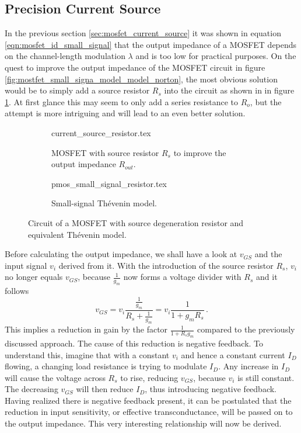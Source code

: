 \subsection{Precision Current Source}%
\label{sec:precision_current_source}
In the previous section \ref{sec:mosfet_current_source} it was shown in equation \ref{eqn:mosfet_id_small_signal} that the output impedance of a MOSFET depends on the channel-length modulation $\lambda$ and is too low for practical purposes. On the quest to improve the output impedance of the MOSFET circuit in figure \ref{fig:mostfet_small_signa_model_model_norton}, the most obvious solution would be to simply add a source resistor $R_s$ into the circuit as shown in in figure \ref{fig:pmos_current_source_resistor}. At first glance this may seem to only add a series resistance to $R_o$, but the attempt is more intriguing and will lead to an even better solution.
\begin{figure}[ht]
    \centering
    \begin{subfigure}[t]{0.45\linewidth}
        \centering
        {current_source_resistor.tex}
        \caption{MOSFET with source resistor $R_s$ to improve the output impedance $R_{out}$.}
        \label{fig:pmos_current_source_resistor}
    \end{subfigure}%
    \begin{subfigure}[t]{0.45\linewidth}
         \centering
         {pmos_small_signal_resistor.tex}
         \caption{Small-signal Thévenin model.}
         \label{fig:pmos_current_source_resistor_small_signal}
     \end{subfigure}%
     \caption{Circuit of a MOSFET with source degeneration resistor and equivalent Thévenin model.}
\end{figure}

Before calculating the output impedance, we shall have a look at $v_{GS}$ and the input signal $v_i$ derived from it. With the introduction of the source resistor $R_s$, $v_i$ no longer equals $v_{GS}$, because $\frac{1}{g_m}$ now forms a voltage divider with $R_s$ and it follows
\begin{equation}
    v_{GS} = v_i \frac{\frac{1}{g_m}}{R_s + \frac{1}{g_m}} = v_i \frac{1}{1 + g_m R_s} \,.
\end{equation}
This implies a reduction in gain by the factor $\frac{1}{1 + R_s g_m}$ compared to the previously discussed approach. The cause of this reduction is negative feedback. To understand this, imagine that with a constant $v_i$ and hence a constant current $I_D$ flowing, a changing load resistance is trying to modulate $I_D$. Any increase in $I_D$ will cause the voltage across $R_s$ to rise, reducing $v_{GS}$, because $v_i$ is still constant. The decreasing $v_{GS}$ will then reduce $I_D$, thus introducing negative feedback. Having realized there is negative feedback present, it can be postulated that the reduction in input sensitivity, or effective transconductance, will be passed on to the output impedance. This very interesting relationship will now be derived.

